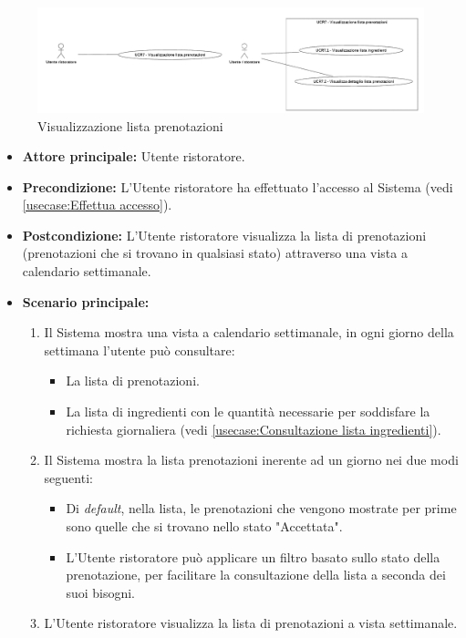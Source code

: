 \label{usecase:Visualizzazione lista prenotazioni}

\begin{figure}[h]
	\centering
	\includegraphics[width=0.999\textwidth]{./uml/UCR7.png} 
	\caption{Visualizzazione lista prenotazioni}
	\label{fig:UCR7}
  \end{figure}

\begin{itemize}
	\item \textbf{Attore principale:} Utente ristoratore.

	\item \textbf{Precondizione:} L'Utente ristoratore ha effettuato l'accesso al Sistema (vedi \autoref{usecase:Effettua accesso}).

	\item \textbf{Postcondizione:} L'Utente ristoratore visualizza la lista di prenotazioni (prenotazioni che si trovano in qualsiasi stato) attraverso una vista a calendario settimanale.

	\item \textbf{Scenario principale:}
	      \begin{enumerate}
		      \item Il Sistema mostra una vista a calendario settimanale, in ogni giorno della settimana l'utente può consultare:
		            \begin{itemize}
			            \item La lista di prenotazioni.
			            \item La lista di ingredienti con le quantità necessarie per soddisfare la richiesta giornaliera (vedi \autoref{usecase:Consultazione lista ingredienti}).
		            \end{itemize}

		      \item Il Sistema mostra la lista prenotazioni inerente ad un giorno nei due modi seguenti:
		            \begin{itemize}
			            \item Di \textit{default}, nella lista, le prenotazioni che vengono mostrate per prime sono quelle che si trovano nello stato "Accettata".

			            \item L'Utente ristoratore può applicare un filtro basato sullo stato della prenotazione, per facilitare la consultazione della lista a seconda dei suoi bisogni.
		            \end{itemize}

		      \item L'Utente ristoratore visualizza la lista di prenotazioni a vista settimanale.
	      \end{enumerate}
\end{itemize}


